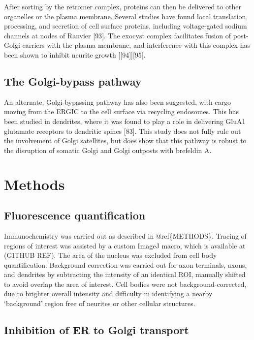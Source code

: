 \documentclass[
  12pt,
  a4paper,
]{book}
\begin{document}
After sorting by the retromer complex, proteins can then be delivered to other organelles or the plasma membrane. Several studies have found local translation, processing, and secretion of cell surface proteins, including voltage-gated sodium channels at nodes of Ranvier {[}93{]}. The exocyst complex facilitates fusion of post-Golgi carriers with the plasma membrane, and interference with this complex has been shown to inhibit neurite growth {[}{[}94{]}{]}{[}95{]}.

\hypertarget{the-golgi-bypass-pathway}{%
\subsection{The Golgi-bypass pathway}\label{the-golgi-bypass-pathway}}

An alternate, Golgi-bypassing pathway has also been suggested, with cargo moving from the ERGIC to the cell surface via recycling endosomes. This has been studied in dendrites, where it was found to play a role in delivering GluA1 glutamate receptors to dendritic spines {[}83{]}. This study does not fully rule out the involvement of Golgi satellites, but does show that this pathway is robust to the disruption of somatic Golgi and Golgi outposts with brefeldin A.

\hypertarget{methods-2}{%
\section{Methods}\label{methods-2}}

\hypertarget{fluorescence-quantification-1}{%
\subsection{Fluorescence quantification}\label{fluorescence-quantification-1}}

Immunochemistry was carried out as described in @ref\{METHODS\}. Tracing of regions of interest was assisted by a custom ImageJ macro, which is available at (GITHUB REF). The area of the nucleus was excluded from cell body quantification. Background correction was carried out for axon terminals, axons, and dendrites by subtracting the intensity of an identical ROI, manually shifted to avoid overlap the area of interest. Cell bodies were not background-corrected, due to brighter overall intensity and difficulty in identifying a nearby `background' region free of neurites or other cellular structures.

\hypertarget{inhibition-of-er-to-golgi-transport}{%
\subsection{Inhibition of ER to Golgi transport}\label{inhibition-of-er-to-golgi-transport}}
\end{document}
